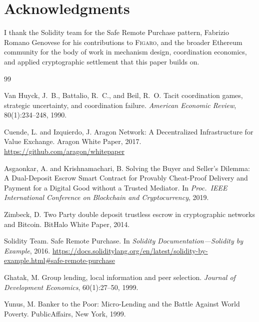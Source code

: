\documentclass[11pt,a4paper]{article}
\theoremstyle{definition}
\theoremstyle{remark}
\newcommand{\figaro}{\textsc{Figaro}}
\begin{document}
\section*{Acknowledgments}
I thank the Solidity team for the Safe Remote Purchase pattern,
Fabrizio Romano Genovese for his contributions to \figaro{}, and
the broader Ethereum community for the body of work in mechanism
design, coordination economics, and applied cryptographic
settlement that this paper builds on.



\begin{thebibliography}{99}

Van Huyck, J.~B., Battalio, R.~C., and Beil, R.~O.
\newblock Tacit coordination games, strategic uncertainty, and coordination
  failure.
\newblock \emph{American Economic Review}, 80(1):234--248, 1990.

Cuende, L. and Izquierdo, J.
\newblock Aragon Network: A Decentralized Infrastructure for Value Exchange.
\newblock Aragon White Paper, 2017.
\newblock \url{https://github.com/aragon/whitepaper}

Asgaonkar, A. and Krishnamachari, B.
\newblock Solving the Buyer and Seller's Dilemma: A Dual-Deposit Escrow Smart
  Contract for Provably Cheat-Proof Delivery and Payment for a Digital Good
  without a Trusted Mediator.
\newblock In \emph{Proc.\ IEEE International Conference on Blockchain and
  Cryptocurrency}, 2019.

Zimbeck, D.
\newblock Two Party double deposit trustless escrow in cryptographic
  networks and Bitcoin.
\newblock BitHalo White Paper, 2014.

Solidity Team.
\newblock Safe Remote Purchase.
\newblock In \emph{Solidity Documentation---Solidity by Example}, 2016.
\newblock \url{https://docs.soliditylang.org/en/latest/solidity-by-example.html#safe-remote-purchase}

Ghatak, M.
\newblock Group lending, local information and peer selection.
\newblock \emph{Journal of Development Economics}, 60(1):27--50, 1999.

Yunus, M.
\newblock Banker to the Poor: Micro-Lending and the Battle Against World
  Poverty.
\newblock PublicAffairs, New York, 1999.


\end{thebibliography}
\end{document}
